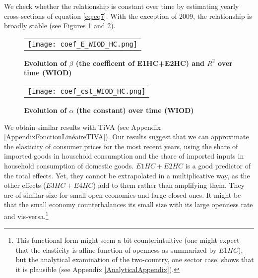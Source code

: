 \documentclass[11pt,a4paper]{article}
\begin{document}
We check whether the relationship is constant over time by estimating yearly cross-sections of equation \ref{eq:eq7}. 
With the exception of 2009, the relationship is broadly stable (see Figures \ref{fig:evolution_b} and \ref{fig:evolution_cst}).

\begin{figure}[!h]
\centering
\caption{\footnotesize{\textbf{Evolution of $\beta$ (the coefficent of E1HC+E2HC) and $R^2$ over time (WIOD)}}}
\begin{tabular}{c}
\texttt{[image: coef\_E\_WIOD\_HC.png]}\\
\end{tabular}
\label{fig:evolution_b}
\end{figure}

\begin{figure}[!h]
\centering
\caption{\footnotesize{\textbf{Evolution of $\alpha$ (the constant) over time (WIOD)}}}
\begin{tabular}{c}
\texttt{[image: coef\_cst\_WIOD\_HC.png]}\\
\end{tabular}
\label{fig:evolution_cst}
\end{figure}


We obtain similar results with TiVA (see Appendix \ref{AppendixFonctionLinéaireTIVA}). 
Our results suggest that we can approximate the elasticity of consumer prices for the most recent years, using the share of imported goods in household consumption and the share of imported inputs in household consumption of domestic goods. $E1HC+E2HC$ is a good predictor of the total effects.
Yet, they cannot be extrapolated in a multiplicative way, as the other effects ($E3HC+E4HC$) add to them rather than amplifying them.
They are of similar size for small open economies and large closed ones.
It might be that the small economy counterbalances its small size with its large openness rate and vis-versa.\footnote{This functional form might seem a bit counterintuitive (one might expect that the elasticity is affine function of openness as summarized by $E1HC$), but the analytical examination of the two-country, one sector case, shows that it is plausible (see Appendix \ref{AnalyticalAppendix}).}
\end{document}
